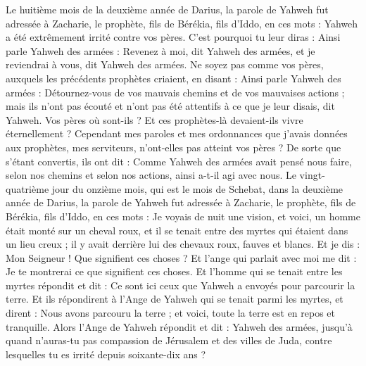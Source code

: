 \begin{multicols}{2}
\VerseOne{}Le huitième mois de la deuxième année de Darius, la parole de Yahweh fut adressée à Zacharie, le prophète, fils de Bérékia, fils d'Iddo, en ces mots :
Yahweh a été extrêmement irrité contre vos pères.
C'est pourquoi tu leur diras : Ainsi parle Yahweh des armées : Revenez à moi, dit Yahweh des armées, et je reviendrai à vous, dit Yahweh des armées.
Ne soyez pas comme vos pères, auxquels les précédents prophètes criaient, en disant : Ainsi parle Yahweh des armées : Détournez-vous de vos mauvais chemins et de vos mauvaises actions ; mais ils n’ont pas écouté et n'ont pas été attentifs à ce que je leur disais, dit Yahweh.
Vos pères où sont-ils ? Et ces prophètes-là devaient-ils vivre éternellement ?
Cependant mes paroles et mes ordonnances que j'avais données aux prophètes, mes serviteurs, n'ont-elles pas atteint vos pères ? De sorte que s'étant convertis, ils ont dit : Comme Yahweh des armées avait pensé nous faire, selon nos chemins et selon nos actions, ainsi a-t-il agi avec nous.
Le vingt-quatrième jour du onzième mois, qui est le mois de Schebat, dans la deuxième année de Darius, la parole de Yahweh fut adressée à Zacharie, le prophète, fils de Bérékia, fils d'Iddo, en ces mots :
Je voyais de nuit une vision, et voici, un homme était monté sur un cheval roux, et il se tenait entre des myrtes qui étaient dans un lieu creux ; il y avait derrière lui des chevaux roux, fauves et blancs.
Et je dis : Mon Seigneur ! Que signifient ces choses ? Et l'ange qui  parlait avec moi me dit : Je te montrerai ce que signifient ces choses.
Et l'homme qui se tenait entre les myrtes répondit et dit : Ce sont ici ceux que Yahweh a envoyés pour parcourir la terre.
Et ils répondirent à l'Ange de Yahweh qui se tenait parmi les myrtes, et dirent : Nous avons parcouru la terre ; et voici, toute la terre est en repos et tranquille.
Alors l'Ange de Yahweh répondit et dit : Yahweh des armées, jusqu'à quand n'auras-tu pas compassion de Jérusalem et des villes de Juda, contre lesquelles tu es irrité depuis soixante-dix ans ?

\end{multicols}
